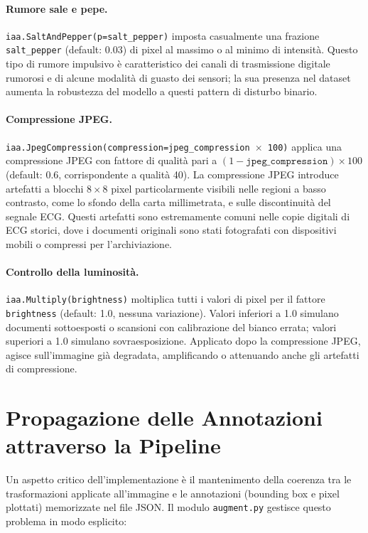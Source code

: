 \paragraph{Rumore sale e pepe.} \texttt{iaa.SaltAndPepper(p=salt\_pepper)} imposta casualmente una frazione \texttt{salt\_pepper} (default: 0.03) di pixel al massimo o al minimo di intensità. Questo tipo di rumore impulsivo è caratteristico dei canali di trasmissione digitale rumorosi e di alcune modalità di guasto dei sensori; la sua presenza nel dataset aumenta la robustezza del modello a questi pattern di disturbo binario.

\paragraph{Compressione JPEG.} \texttt{iaa.JpegCompression(\allowbreak{}compression=jpeg\_compression $\times$ 100)} applica una compressione JPEG con fattore di qualità pari a $(1 - \texttt{jpeg\_compression}) \times 100$ (default: 0.6, corrispondente a qualità 40). La compressione JPEG introduce artefatti a blocchi $8\times8$ pixel particolarmente visibili nelle regioni a basso contrasto, come lo sfondo della carta millimetrata, e sulle discontinuità del segnale ECG. Questi artefatti sono estremamente comuni nelle copie digitali di ECG storici, dove i documenti originali sono stati fotografati con dispositivi mobili o compressi per l'archiviazione.

\paragraph{Controllo della luminosità.} \texttt{iaa.Multiply(brightness)} moltiplica tutti i valori di pixel per il fattore \texttt{brightness} (default: 1.0, nessuna variazione). Valori inferiori a 1.0 simulano documenti sottoesposti o scansioni con calibrazione del bianco errata; valori superiori a 1.0 simulano sovraesposizione. Applicato dopo la compressione JPEG, agisce sull'immagine già degradata, amplificando o attenuando anche gli artefatti di compressione.

\section{Propagazione delle Annotazioni attraverso la Pipeline}
\label{sec:propagazione}

Un aspetto critico dell'implementazione è il mantenimento della coerenza tra le trasformazioni applicate all'immagine e le annotazioni (bounding box e pixel plottati) memorizzate nel file JSON. Il modulo \texttt{augment.py} gestisce questo problema in modo esplicito:


